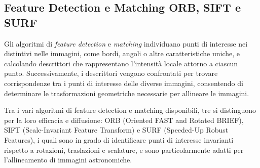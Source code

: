 \subsection{Feature Detection e Matching ORB, SIFT e SURF} \label{subsec:feature_detection}

Gli algoritmi di \textit{feature detection} e \textit{matching} individuano punti di interesse nei distintivi nelle immagini, come bordi, angoli o altre caratteristiche uniche, e calcolando descrittori che rappresentano l'intensità locale attorno a ciascun punto. Successivamente, i descrittori vengono confrontati per trovare corrispondenze tra i punti di interesse delle diverse immagini, consentendo di determinare le trasformazioni geometriche necessarie per allineare le immagini.

Tra i vari algoritmi di feature detection e matching disponibili, tre si distinguono per la loro efficacia e diffusione: ORB (Oriented FAST and Rotated BRIEF), SIFT (Scale-Invariant Feature Transform) e SURF (Speeded-Up Robust Features), i quali sono in grado di identificare punti di interesse invarianti rispetto a rotazioni, traslazioni e scalature, e sono particolarmente adatti per l'allineamento di immagini astronomiche.

